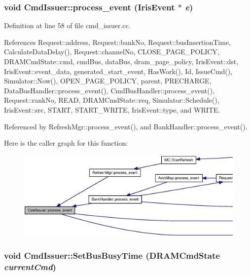 \subsubsection[{process\_\-event}]{\setlength{\rightskip}{0pt plus 5cm}void CmdIssuer::process\_\-event ({\bf IrisEvent} $\ast$ {\em e})}\label{classCmdIssuer_37cfadf3b2fe7118c26dc5bdee0e92b0}




Definition at line 58 of file cmd\_\-issuer.cc.

References Request::address, Request::bankNo, Request::busInsertionTime, CalculateDataDelay(), Request::channelNo, CLOSE\_\-PAGE\_\-POLICY, DRAMCmdState::cmd, cmdBus, dataBus, dram\_\-page\_\-policy, IrisEvent::dst, IrisEvent::event\_\-data, generated\_\-start\_\-event, HasWork(), Id, IssueCmd(), Simulator::Now(), OPEN\_\-PAGE\_\-POLICY, parent, PRECHARGE, DataBusHandler::process\_\-event(), CmdBusHandler::process\_\-event(), Request::rankNo, READ, DRAMCmdState::req, Simulator::Schedule(), IrisEvent::src, START, START\_\-WRITE, IrisEvent::type, and WRITE.

Referenced by RefreshMgr::process\_\-event(), and BankHandler::process\_\-event().

Here is the caller graph for this function:\nopagebreak
\begin{figure}[H]
\begin{center}
\leavevmode
\includegraphics[width=420pt]{classCmdIssuer_37cfadf3b2fe7118c26dc5bdee0e92b0_icgraph}
\end{center}
\end{figure}
\subsubsection[{SetBusBusyTime}]{\setlength{\rightskip}{0pt plus 5cm}void CmdIssuer::SetBusBusyTime ({\bf DRAMCmdState} {\em currentCmd})}\label{classCmdIssuer_cad3d934f37eeea768b3eca35b56b558}




